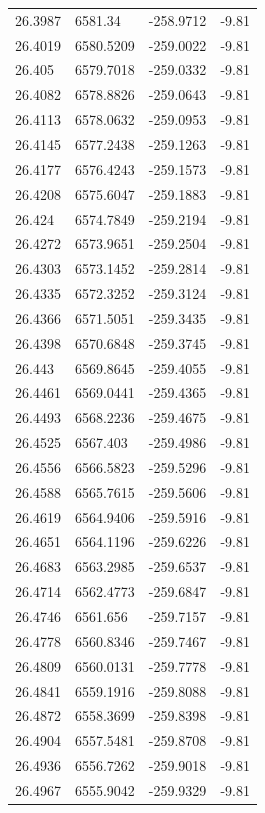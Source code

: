 \begin{table}[H]
\begin{tabular}{llll}
26.3987 & 6581.34 & -258.9712 & -9.81 \\
26.4019 & 6580.5209 & -259.0022 & -9.81 \\
26.405 & 6579.7018 & -259.0332 & -9.81 \\
26.4082 & 6578.8826 & -259.0643 & -9.81 \\
26.4113 & 6578.0632 & -259.0953 & -9.81 \\
26.4145 & 6577.2438 & -259.1263 & -9.81 \\
26.4177 & 6576.4243 & -259.1573 & -9.81 \\
26.4208 & 6575.6047 & -259.1883 & -9.81 \\
26.424 & 6574.7849 & -259.2194 & -9.81 \\
26.4272 & 6573.9651 & -259.2504 & -9.81 \\
26.4303 & 6573.1452 & -259.2814 & -9.81 \\
26.4335 & 6572.3252 & -259.3124 & -9.81 \\
26.4366 & 6571.5051 & -259.3435 & -9.81 \\
26.4398 & 6570.6848 & -259.3745 & -9.81 \\
26.443 & 6569.8645 & -259.4055 & -9.81 \\
26.4461 & 6569.0441 & -259.4365 & -9.81 \\
26.4493 & 6568.2236 & -259.4675 & -9.81 \\
26.4525 & 6567.403 & -259.4986 & -9.81 \\
26.4556 & 6566.5823 & -259.5296 & -9.81 \\
26.4588 & 6565.7615 & -259.5606 & -9.81 \\
26.4619 & 6564.9406 & -259.5916 & -9.81 \\
26.4651 & 6564.1196 & -259.6226 & -9.81 \\
26.4683 & 6563.2985 & -259.6537 & -9.81 \\
26.4714 & 6562.4773 & -259.6847 & -9.81 \\
26.4746 & 6561.656 & -259.7157 & -9.81 \\
26.4778 & 6560.8346 & -259.7467 & -9.81 \\
26.4809 & 6560.0131 & -259.7778 & -9.81 \\
26.4841 & 6559.1916 & -259.8088 & -9.81 \\
26.4872 & 6558.3699 & -259.8398 & -9.81 \\
26.4904 & 6557.5481 & -259.8708 & -9.81 \\
26.4936 & 6556.7262 & -259.9018 & -9.81 \\
26.4967 & 6555.9042 & -259.9329 & -9.81 \\

\end{tabular}
\end{table}
